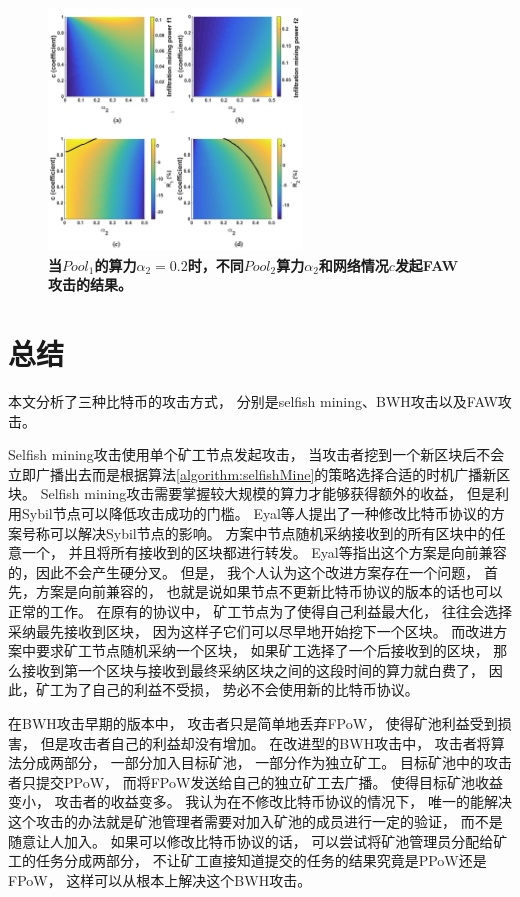 \documentclass[a4paper, 11pt]{article}
\begin{document}
\begin{CJK*}{UTF8}{gbsn}
    \begin{figure}[h]
        \centering
        \includegraphics[width=0.6\textwidth]{figure6}
        \caption{\textbf{当$Pool_1$的算力$\alpha_2=0.2$时，不同$Pool_2$算力$\alpha_2$和网络情况$c$发起FAW攻击的结果。}}
        \label{figure:figure6}
    \end{figure}

    \section{总结}

    \indent

    本文分析了三种比特币的攻击方式，
    分别是selfish mining、BWH攻击以及FAW攻击。
    
    Selfish mining攻击使用单个矿工节点发起攻击，
    当攻击者挖到一个新区块后不会立即广播出去而是根据算法\ref{algorithm:selfishMine}的策略选择合适的时机广播新区块。
    Selfish mining攻击需要掌握较大规模的算力才能够获得额外的收益，
    但是利用Sybil节点可以降低攻击成功的门槛。
    Eyal等人提出了一种修改比特币协议的方案号称可以解决Sybil节点的影响。
    方案中节点随机采纳接收到的所有区块中的任意一个，
    并且将所有接收到的区块都进行转发。
    Eyal等指出这个方案是向前兼容的，因此不会产生硬分叉。
    但是，
    我个人认为这个改进方案存在一个问题，
    首先，方案是向前兼容的，
    也就是说如果节点不更新比特币协议的版本的话也可以正常的工作。
    在原有的协议中，
    矿工节点为了使得自己利益最大化，
    往往会选择采纳最先接收到区块，
    因为这样子它们可以尽早地开始挖下一个区块。
    而改进方案中要求矿工节点随机采纳一个区块，
    如果矿工选择了一个后接收到的区块，
    那么接收到第一个区块与接收到最终采纳区块之间的这段时间的算力就白费了，
    因此，矿工为了自己的利益不受损，
    势必不会使用新的比特币协议。

    在BWH攻击早期的版本中，
    攻击者只是简单地丢弃FPoW，
    使得矿池利益受到损害，
    但是攻击者自己的利益却没有增加。
    在改进型的BWH攻击中，
    攻击者将算法分成两部分，
    一部分加入目标矿池，
    一部分作为独立矿工。
    目标矿池中的攻击者只提交PPoW，
    而将FPoW发送给自己的独立矿工去广播。
    使得目标矿池收益变小，
    攻击者的收益变多。
    我认为在不修改比特币协议的情况下，
    唯一的能解决这个攻击的办法就是矿池管理者需要对加入矿池的成员进行一定的验证，
    而不是随意让人加入。
    如果可以修改比特币协议的话，
    可以尝试将矿池管理员分配给矿工的任务分成两部分，
    不让矿工直接知道提交的任务的结果究竟是PPoW还是FPoW，
    这样可以从根本上解决这个BWH攻击。


\end{CJK*}
\end{document}
